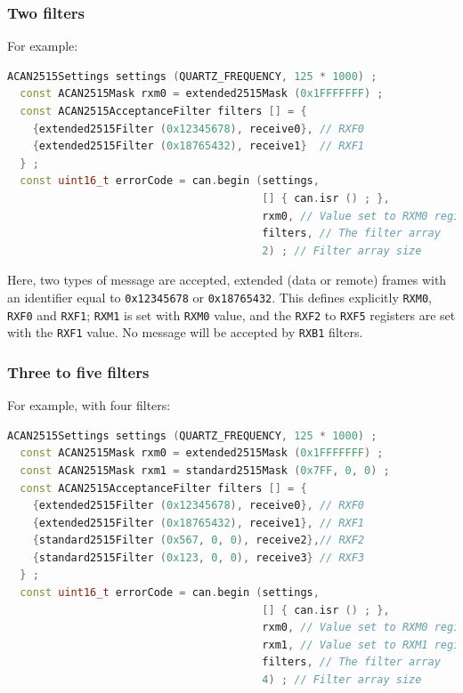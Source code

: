 \documentclass[10pt, a4paper, obeyspaces]{extarticle}
\newcommand \subsubsectionLabel[2]{\subsubsection{#1}\label{subsubsec:#2}}
\begin{document}
\subsubsectionLabel{Two filters}{twoFilters}

For example:
{ \small\begin{lstlisting}[language=c++]
  ACAN2515Settings settings (QUARTZ_FREQUENCY, 125 * 1000) ;
  const ACAN2515Mask rxm0 = extended2515Mask (0x1FFFFFFF) ;
  const ACAN2515AcceptanceFilter filters [] = {
    {extended2515Filter (0x12345678), receive0}, // RXF0
    {extended2515Filter (0x18765432), receive1}  // RXF1
  } ;
  const uint16_t errorCode = can.begin (settings,
                                        [] { can.isr () ; },
                                        rxm0, // Value set to RXM0 register
                                        filters, // The filter array
                                        2) ; // Filter array size
\end{lstlisting}}

Here, two types of message are accepted, extended (data or remote) frames with an identifier equal to \texttt{0x12345678} or \texttt{0x18765432}. This defines explicitly \texttt{RXM0}, \texttt{RXF0} and \texttt{RXF1}; \texttt{RXM1} is set with \texttt{RXM0} value, and the \texttt{RXF2} to \texttt{RXF5} registers are set with the \texttt{RXF1} value. No message will be accepted by \texttt{RXB1} filters.










\subsubsectionLabel{Three to five filters}{threeToFiveFilters}

For example, with four filters:
{ \small\begin{lstlisting}[language=c++]
  ACAN2515Settings settings (QUARTZ_FREQUENCY, 125 * 1000) ;
  const ACAN2515Mask rxm0 = extended2515Mask (0x1FFFFFFF) ;
  const ACAN2515Mask rxm1 = standard2515Mask (0x7FF, 0, 0) ;
  const ACAN2515AcceptanceFilter filters [] = {
    {extended2515Filter (0x12345678), receive0}, // RXF0
    {extended2515Filter (0x18765432), receive1}, // RXF1
    {standard2515Filter (0x567, 0, 0), receive2},// RXF2
    {standard2515Filter (0x123, 0, 0), receive3} // RXF3
  } ;
  const uint16_t errorCode = can.begin (settings,
                                        [] { can.isr () ; },
                                        rxm0, // Value set to RXM0 register
                                        rxm1, // Value set to RXM1 register
                                        filters, // The filter array
                                        4) ; // Filter array size
\end{lstlisting}}
\end{document}
